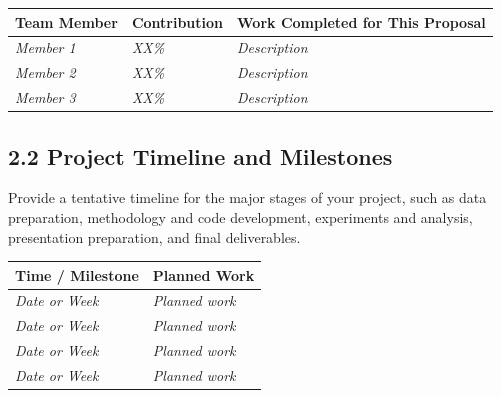 \documentclass[11pt]{article}
\begin{document}
\begin{center}
\begin{tabularx}{\textwidth}{
    >{\raggedright\arraybackslash}p{}
    >{\centering\arraybackslash}p{}
    >{\raggedright\arraybackslash}X}
\toprule
\textbf{Team Member} & \textbf{Contribution} & \textbf{Work Completed for This Proposal} \\
\midrule
\textit{Member 1} & \textit{XX\%} & \textit{Description} \\
\textit{Member 2} & \textit{XX\%} & \textit{Description} \\
\textit{Member 3} & \textit{XX\%} & \textit{Description} \\
\bottomrule
\end{tabularx}
\end{center}

\subsection*{2.2 Project Timeline and Milestones}

Provide a tentative timeline for the major stages of your project, such as data preparation, methodology and code development, experiments and analysis, presentation preparation, and final deliverables.

\begin{center}
\begin{tabularx}{\textwidth}{
    >{\raggedright\arraybackslash}p{}
    >{\raggedright\arraybackslash}X}
\toprule
\textbf{Time / Milestone} & \textbf{Planned Work} \\
\midrule
\textit{Date or Week} & \textit{Planned work} \\
\textit{Date or Week} & \textit{Planned work} \\
\textit{Date or Week} & \textit{Planned work} \\
\textit{Date or Week} & \textit{Planned work} \\
\bottomrule
\end{tabularx}
\end{center}






\end{document}
